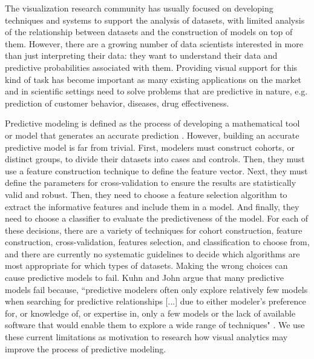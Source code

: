 The visualization research community has usually focused on developing techniques and systems to support the analysis of datasets, with limited analysis of the relationship between datasets and the construction of models on top of them. However, there are a growing number of data scientists interested in more than just interpreting their data: they want to understand their data and predictive probabilities associated with them. Providing visual support for this kind of task has become important as many existing applications on the market and in scientific settings need to solve problems that are predictive in nature, e.g. prediction of customer behavior, diseases, drug effectiveness.

Predictive modeling is defined as the process of developing a mathematical tool or model that generates an accurate prediction \cite{kuhn2013applied}. However, building an accurate predictive model is far from trivial. First, modelers must construct cohorts, or distinct groups, to divide their datasets into cases and controls. Then, they must use a feature construction technique to define the feature vector. Next, they must define the parameters for cross-validation to ensure the results are statistically valid and robust. Then, they need to choose a feature selection algorithm to extract the informative features and include them in a model. And finally, they need to choose a classifier to evaluate the predictiveness of the model. For each of these decisions, there are a variety of techniques for cohort construction, feature construction, cross-validation, features selection, and classification to choose from, and there are currently no systematic guidelines to decide which algorithms are most appropriate for which types of datasets. Making the wrong choices can cause predictive models to fail. Kuhn and John argue that many predictive models fail because, ``predictive modelers often only explore relatively few models when searching for predictive relationships [...] due to either modeler's preference for, or knowledge of, or expertise in, only a few models or the lack of available software that would enable them to explore a wide range of techniques" \cite{kuhn2013applied}. We use these current limitations as motivation to research how visual analytics may improve the process of predictive modeling.

